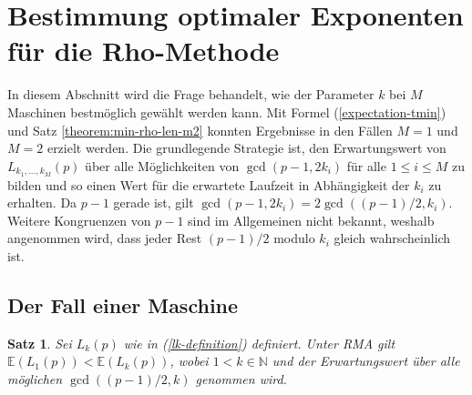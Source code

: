 \documentclass[a4paper, 11pt, ngerman]{article}
\newcommand{\E}{\mathbb{E}}
\newcommand{\N}{\mathbb{N}}
\theoremstyle{definition}
\theoremstyle{plain}
\newtheorem{theorem}{Satz}
\theoremstyle{remark}
\begin{document}
\section{Bestimmung optimaler Exponenten für die Rho-Methode}
\label{sec:optimal-k}

In diesem Abschnitt wird die Frage behandelt, wie der Parameter $k$ bei $M$ Maschinen bestmöglich gewählt werden kann. Mit Formel (\ref{expectation-tmin}) und Satz \ref{theorem:min-rho-len-m2} konnten Ergebnisse in den Fällen $M = 1$ und $M = 2$ erzielt werden. Die grundlegende Strategie ist, den Erwartungswert von $L_{k_1, \dots, k_M}(p)$ über alle Möglichkeiten von $\gcd(p - 1, 2k_i)$ für alle $1 \le i \le M$ zu bilden und so einen Wert für die erwartete Laufzeit in Abhängigkeit der $k_i$ zu erhalten. Da $p - 1$ gerade ist, gilt $\gcd(p-1, 2k_i) = 2\gcd((p - 1)/2, k_i)$. Weitere Kongruenzen von $p - 1$ sind im Allgemeinen nicht bekannt, weshalb angenommen wird, dass jeder Rest $(p- 1)/2$ modulo $k_i$ gleich wahrscheinlich ist.

\subsection{Der Fall einer Maschine}

\begin{theorem}
    \label{theorem:optimal-k-m1}
    Sei $L_k(p)$ wie in (\ref{lk-definition}) definiert. Unter RMA gilt $\E(L_1(p)) < \E(L_k(p))$, wobei $1 < k \in \N$ und der Erwartungswert über alle möglichen $\gcd((p - 1)/2, k)$ genommen wird.
\end{theorem}
\end{document}
